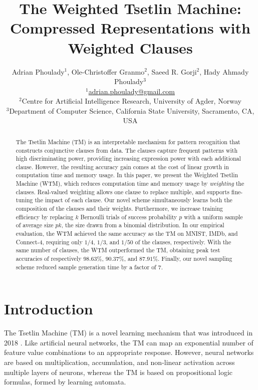 \documentclass[letterpaper]{article}
\begin{document}
\title{The Weighted Tsetlin Machine:\\Compressed Representations with Weighted Clauses}
\author{Adrian Phoulady$^1$, Ole-Christoffer Granmo$^2$, Saeed R. Gorji$^2$, Hady Ahmady Phoulady$^3$\\
        \small $^1$\href{mailto:adrian.phoulady@gmail.com}{adrian.phoulady@gmail.com}\\
        \small $^2$Centre for Artificial Intelligence Research, University of Agder, Norway\\
        \small $^3$Department of Computer Science, California State University, Sacramento, CA, USA}
\nocopyright
\maketitle
\begin{abstract}
The Tsetlin Machine (TM) is an interpretable mechanism for pattern recognition that constructs conjunctive clauses from data. The clauses capture frequent patterns with high discriminating power, providing increasing expression power with each additional clause. However, the resulting accuracy gain comes at the cost of linear growth in computation time and memory usage. In this paper, we present the Weighted Tsetlin Machine (WTM), which reduces computation time and memory usage by \emph{weighting} the clauses. Real-valued weighting allows one clause to replace multiple, and supports fine-tuning the impact of each clause. Our novel scheme simultaneously learns both the composition of the clauses and their weights. Furthermore, we increase training efficiency by replacing $k$ Bernoulli trials of success probability $p$ with a uniform sample of average size $p k$, the size drawn from a binomial distribution. In our empirical evaluation, the WTM achieved the same accuracy as the TM on MNIST, IMDb, and Connect-4, requiring only $1/4$, $1/3$, and $1/50$ of the clauses, respectively. With the same number of clauses, the WTM outperformed the TM, obtaining peak test accuracies of respectively $98.63\%$, $90.37\%$, and $87.91\%$. Finally, our novel sampling scheme reduced sample generation time by a factor of $7$.
\end{abstract}

\maketitle
{}
\section{Introduction}
The Tsetlin Machine (TM) is a novel learning mechanism that was introduced in 2018 \cite{granmo2018tsetlin}. Like artificial neural networks, the TM can map an exponential number of feature value combinations to an appropriate response. However, neural networks are based on multiplication, accumulation, and non-linear activation across multiple layers of neurons, whereas the TM is based on propositional logic formulas, formed by learning automata. 
\end{document}

